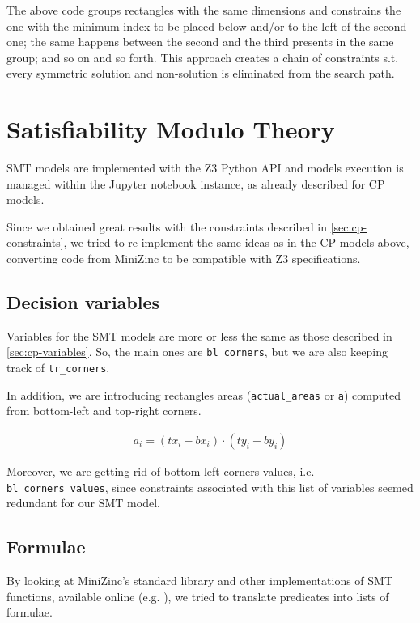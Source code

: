 \documentclass[a4paper,10pt]{article}
\begin{document}
The above code groups rectangles with the same dimensions and constrains the one with the minimum index to be placed below and/or to the left of the second one; the same happens between the second and the third presents in the same group; and so on and so forth. This approach creates a chain of constraints s.t. every symmetric solution and non-solution is eliminated from the search path.

\newpage

\section{Satisfiability Modulo Theory} \label{sec:smt}
SMT models are implemented with the Z3 Python API and models execution is managed within the Jupyter notebook instance, as already described for CP models.

Since we obtained great results with the constraints described in \ref{sec:cp-constraints}, we tried to re-implement the same ideas as in the CP models above, converting code from MiniZinc to be compatible with Z3 specifications.

\subsection{Decision variables}
Variables for the SMT models are more or less the same as those described in \ref{sec:cp-variables}. So, the main ones are \texttt{bl\_corners}, but we are also keeping track of \texttt{tr\_corners}. 

In addition, we are introducing rectangles areas (\texttt{actual\_areas} or \texttt{a}) computed from bottom-left and top-right corners. 

\begin{gather*}
   a_{i} = (tx_{i} - bx_{i}) \cdot (ty_{i} - by_{i})
\end{gather*}

Moreover, we are getting rid of bottom-left corners values, i.e. \texttt{bl\_corners\_values}, since constraints associated with this list of variables seemed redundant for our SMT model.

\subsection{Formulae}
By looking at MiniZinc's standard library \cite{minizinc-lib} and other implementations of SMT functions, available online (e.g. \cite{hakank}), we tried to translate predicates into lists of formulae.
\end{document}
